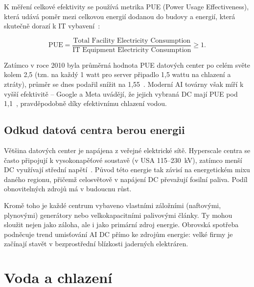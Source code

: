 K měření celkové efektivity se používá metrika PUE (Power Usage Effectiveness), která udává poměr mezi celkovou energií dodanou do budovy a energií, která skutečně dorazí k IT vybavení~\cite{chen_electricity_2025}:

$$\text{PUE} = \frac{\text{Total Facility Electricity Consumption}}{\text{IT Equipment Electricity Consumption}} \geq 1.$$

Zatímco v roce 2010 byla průměrná hodnota PUE datových center po celém světe kolem 2,5 (tzn. na každý 1 watt pro server připadlo 1,5 wattu na chlazení a ztráty), průměr se dnes podařil snížit na 1,55~\cite{de_roucy-rochegonde_ai_2025}. Moderní AI továrny však míří k vyšší efektivitě -- Google a Meta uvádějí, že jejich vybraná DC mají PUE pod 1,1~\cite{chen_electricity_2025, sheng_power_2026}, pravděpodobně díky efektivnímu chlazení vodou.

\subsection{Odkud datová centra berou energii}
\label{subsec:odkud_energie}

Většina datových center je napájena z veřejné elektrické sítě. Hyperscale centra se často připojují k vysokonapěťové soustavě (v USA 115--230~kV), zatímco menší DC využívají střední napětí~\cite[s.~4]{chen_electricity_2025}. Původ této energie tak závisí na energetickém mixu daného regionu, přičemž celosvětově v napájení DC převažují fosilní paliva. Podíl obnovitelných zdrojů má v budoucnu růst.~\cite[s.~86]{international_energy_agency_iea_energy_2025}

Kromě toho je každé centrum vybaveno vlastními záložními (naftovými, plynovými) generátory nebo velkokapacitními palivovými články. Ty mohou sloužit nejen jako záloha, ale i jako primární zdroj energie. Obrovská spotřeba podněcuje trend umisťování AI DC přímo ke zdrojům energie: velké firmy je začínají stavět v bezprostřední blízkosti jaderných elektráren.~\cite{chen_electricity_2025, cruzes_data_2025, international_energy_agency_iea_energy_2025} 

\section{Voda a chlazení}
\label{sec:chlazeni}


